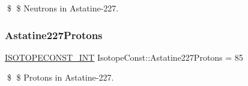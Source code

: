 \$ \$ Neutrons in Astatine-\/227. \mbox{\label{group___isotope_const-_astatine-_at227_ga10fb2bd76fcf1f0e996b9e980d147b9d}} 
\subsubsection{\texorpdfstring{Astatine227\+Protons}{Astatine227Protons}}
{\footnotesize\ttfamily \mbox{\hyperlink{group___isotope_const-_macros_ga5f18360b3e99483a35c32d789e62621c}{I\+S\+O\+T\+O\+P\+E\+C\+O\+N\+S\+T\+\_\+\+I\+NT}} Isotope\+Const\+::\+Astatine227\+Protons = 85}

\$ \$ Protons in Astatine-\/227. 